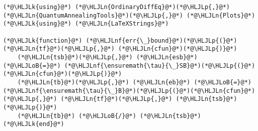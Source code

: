 \documentclass[12pt,a4paper]{article}
\newcommand{\HLJLk}[1]{\textcolor[RGB]{148,91,176}{\textbf{#1}}}
\newcommand{\HLJLn}[1]{#1}
\newcommand{\HLJLnf}[1]{\textcolor[RGB]{66,102,213}{#1}}
\newcommand{\HLJLoB}[1]{\textcolor[RGB]{102,102,102}{\textbf{#1}}}
\newcommand{\HLJLp}[1]{#1}
\begin{document}
\begin{lstlisting}
(*@\HLJLk{using}@*) (*@\HLJLn{OrdinaryDiffEq}@*)(*@\HLJLp{,}@*) (*@\HLJLn{QuantumAnnealingTools}@*)(*@\HLJLp{,}@*) (*@\HLJLn{Plots}@*)
(*@\HLJLk{using}@*) (*@\HLJLn{LaTeXStrings}@*)

(*@\HLJLk{function}@*) (*@\HLJLnf{err{\_}bound}@*)(*@\HLJLp{(}@*)(*@\HLJLn{tf}@*)(*@\HLJLp{,}@*) (*@\HLJLn{cfun}@*)(*@\HLJLp{)}@*)
    (*@\HLJLn{tsb}@*)(*@\HLJLp{,}@*) (*@\HLJLn{esb}@*) (*@\HLJLoB{=}@*) (*@\HLJLnf{\ensuremath{\tau}{\_}SB}@*)(*@\HLJLp{(}@*)(*@\HLJLn{cfun}@*)(*@\HLJLp{)}@*)
    (*@\HLJLn{tb}@*)(*@\HLJLp{,}@*) (*@\HLJLn{eb}@*) (*@\HLJLoB{=}@*) (*@\HLJLnf{\ensuremath{\tau}{\_}B}@*)(*@\HLJLp{(}@*)(*@\HLJLn{cfun}@*)(*@\HLJLp{,}@*) (*@\HLJLn{tf}@*)(*@\HLJLp{,}@*) (*@\HLJLn{tsb}@*)(*@\HLJLp{)}@*)
    (*@\HLJLn{tb}@*) (*@\HLJLoB{/}@*) (*@\HLJLn{tsb}@*)
(*@\HLJLk{end}@*)


\end{lstlisting}
\end{document}
